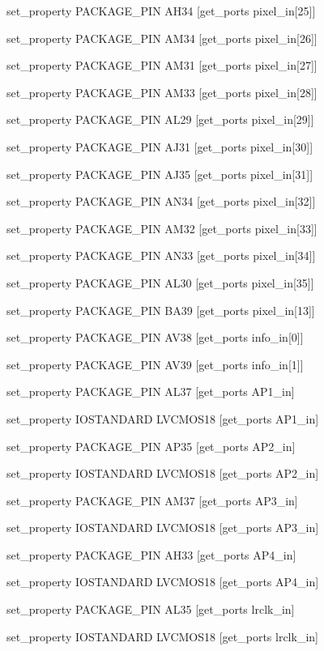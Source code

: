 set\_property PACKAGE\_PIN AH34 [get\_ports {pixel\_in[25]}]

set\_property PACKAGE\_PIN AM34 [get\_ports {pixel\_in[26]}]

set\_property PACKAGE\_PIN AM31 [get\_ports {pixel\_in[27]}]

set\_property PACKAGE\_PIN AM33 [get\_ports {pixel\_in[28]}]

set\_property PACKAGE\_PIN AL29 [get\_ports {pixel\_in[29]}]

set\_property PACKAGE\_PIN AJ31 [get\_ports {pixel\_in[30]}]

set\_property PACKAGE\_PIN AJ35 [get\_ports {pixel\_in[31]}]

set\_property PACKAGE\_PIN AN34 [get\_ports {pixel\_in[32]}]

set\_property PACKAGE\_PIN AM32 [get\_ports {pixel\_in[33]}]

set\_property PACKAGE\_PIN AN33 [get\_ports {pixel\_in[34]}]

set\_property PACKAGE\_PIN AL30 [get\_ports {pixel\_in[35]}]

set\_property PACKAGE\_PIN BA39 [get\_ports {pixel\_in[13]}]

set\_property PACKAGE\_PIN AV38 [get\_ports {info\_in[0]}]

set\_property PACKAGE\_PIN AV39 [get\_ports {info\_in[1]}]



set\_property PACKAGE\_PIN AL37 [get\_ports AP1\_in]

set\_property IOSTANDARD LVCMOS18 [get\_ports AP1\_in]

set\_property PACKAGE\_PIN AP35 [get\_ports AP2\_in]

set\_property IOSTANDARD LVCMOS18 [get\_ports AP2\_in]

set\_property PACKAGE\_PIN AM37 [get\_ports AP3\_in]

set\_property IOSTANDARD LVCMOS18 [get\_ports AP3\_in]

set\_property PACKAGE\_PIN AH33 [get\_ports AP4\_in]

set\_property IOSTANDARD LVCMOS18 [get\_ports AP4\_in]

set\_property PACKAGE\_PIN AL35 [get\_ports lrclk\_in]

set\_property IOSTANDARD LVCMOS18 [get\_ports lrclk\_in]


